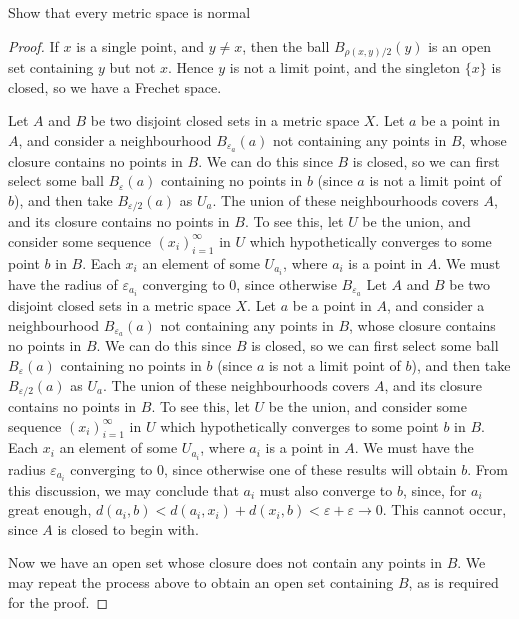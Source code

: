 \begin{exercise}
    Show that every metric space is normal
\end{exercise}
\begin{proof}
    If $x$ is a single point, and $y \neq x$, then the ball $B_{\rho(x,y)/2}(y)$ is an open set containing $y$ but not $x$. Hence $y$ is not a limit point, and the singleton $\{x\}$ is closed, so we have a Frechet space.

    Let $A$ and $B$ be two disjoint closed sets in a metric space $X$. Let $a$ be a point in $A$, and consider a neighbourhood $B_{\varepsilon_a}(a)$ not containing any points in $B$, whose closure contains no points in $B$. We can do this since $B$ is closed, so we can first select some ball $B_\varepsilon(a)$ containing no points in $b$ (since $a$ is not a limit point of $b$), and then take $B_{\varepsilon/2}(a)$ as $U_a$. The union of these neighbourhoods covers $A$, and its closure contains no points in $B$. To see this, let $U$ be the union, and consider some sequence $(x_i)_{i = 1}^\infty$ in $U$ which hypothetically converges to some point $b$ in $B$. Each $x_i$ an element of some $U_{a_i}$, where $a_i$ is a point in $A$. We must have the radius of $\varepsilon_{a_i}$ converging to 0, since otherwise $B_{\varepsilon_a}$
    Let $A$ and $B$ be two disjoint closed sets in a metric space $X$. Let $a$ be a point in $A$, and consider a neighbourhood $B_{\varepsilon_a}(a)$ not containing any points in $B$, whose closure contains no points in $B$. We can do this since $B$ is closed, so we can first select some ball $B_\varepsilon(a)$ containing no points in $b$ (since $a$ is not a limit point of $b$), and then take $B_{\varepsilon/2}(a)$ as $U_a$. The union of these neighbourhoods covers $A$, and its closure contains no points in $B$. To see this, let $U$ be the union, and consider some sequence $(x_i)_{i = 1}^\infty$ in $U$ which hypothetically converges to some point $b$ in $B$. Each $x_i$ an element of some $U_{a_i}$, where $a_i$ is a point in $A$. We must have the radius $\varepsilon_{a_i}$ converging to 0, since otherwise one of these results will obtain $b$. From this discussion, we may conclude that $a_i$ must also converge to $b$, since, for $a_i$ great enough, $d(a_i,b) < d(a_i,x_i) + d(x_i,b) < \varepsilon + \varepsilon \to 0$. This cannot occur, since $A$ is closed to begin with.

    Now we have an open set whose closure does not contain any points in $B$. We may repeat the process above to obtain an open set containing $B$, as is required for the proof.
\end{proof}

